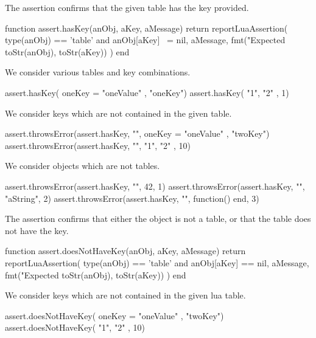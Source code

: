 
The  assertion confirms that the given table has the 
key provided. 

\startLuaCode
function assert.hasKey(anObj, aKey, aMessage)
  return reportLuaAssertion(
    type(anObj) == 'table' and anObj[aKey] ~= nil,
    aMessage,
    fmt("Expected %
      toStr(anObj), toStr(aKey))
  )
end
\stopLuaCode


We consider various tables and key combinations.

\startLuaTest
  assert.hasKey({ oneKey = "oneValue" }, "oneKey")
  assert.hasKey({ "1", "2" }, 1)
\stopLuaTest
\stopTestCase


We consider keys which are not contained in the given table. 

\startLuaTest
  assert.throwsError(assert.hasKey, "",
    { oneKey = "oneValue" }, "twoKey")
  assert.throwsError(assert.hasKey, "",
    { "1", "2" }, 10)
\stopLuaTest
\stopTestCase


We consider objects which are not tables.

\startLuaTest
  assert.throwsError(assert.hasKey, "", 42, 1)
  assert.throwsError(assert.hasKey, "", "aString", 2)
  assert.throwsError(assert.hasKey, "", function() end, 3)
\stopLuaTest
\stopTestCase

\stopTestSuite


The  assertion confirms that either the object 
is not a table, or that the table does not have the key. 

\startLuaCode
function assert.doesNotHaveKey(anObj, aKey, aMessage)
  return reportLuaAssertion(
    type(anObj) == 'table' and anObj[aKey] == nil,
    aMessage,
    fmt("Expected %
      toStr(anObj), toStr(aKey))
  )
end
\stopLuaCode


We consider keys which are not contained in the given lua table.

\startLuaTest
  assert.doesNotHaveKey({ oneKey = "oneValue" }, "twoKey")
  assert.doesNotHaveKey({ "1", "2" }, 10)
\stopLuaTest
\stopTestCase

